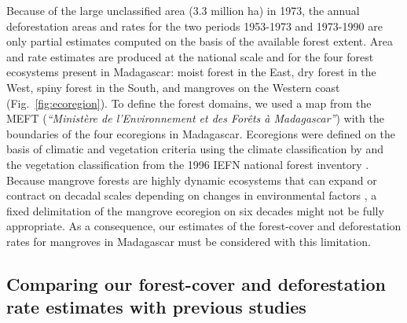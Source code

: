 \documentclass[a4paper, 12pt, leqno]{article} %
\begin{document}
Because of the large unclassified area (3.3 million ha) in 1973, the
annual deforestation areas and rates for the two periods 1953-1973 and
1973-1990 are only partial estimates computed on the basis of the
available forest extent. Area and rate estimates are produced at the
national scale and for the four forest ecosystems present in
Madagascar: moist forest in the East, dry forest in the West, spiny
forest in the South, and mangroves on the Western coast
(Fig.~\ref{fig:ecoregion}). To define the forest domains, we used a
map from the MEFT (\emph{``Ministère de l'Environnement et des Forêts
  à Madagascar''}) with the boundaries of the four ecoregions in
Madagascar. Ecoregions were defined on the basis of climatic and
vegetation criteria using the climate classification by
\citet{Cornet1974} and the vegetation classification from the 1996
IEFN national forest inventory \citep{IEFN1996}. Because mangrove
forests are highly dynamic ecosystems that can expand or contract on
decadal scales depending on changes in environmental factors
\citep{Armitage2015}, a fixed delimitation of the mangrove ecoregion
on six decades might not be fully appropriate. As a consequence, our
estimates of the forest-cover and deforestation rates for mangroves in
Madagascar must be considered with this limitation.

\subsection{Comparing our forest-cover and deforestation rate
estimates with previous studies}
\end{document}
